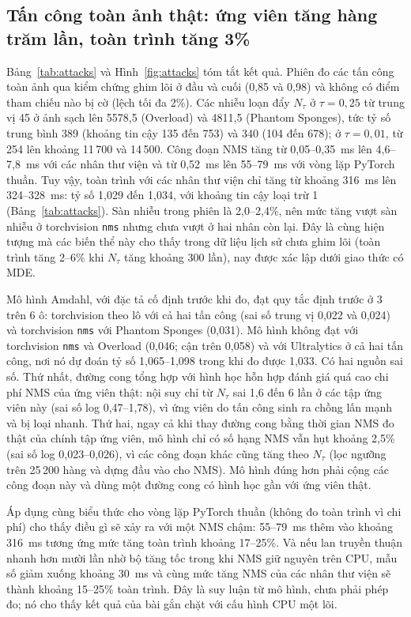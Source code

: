 \documentclass[a4paper,fleqn]{cas-dc}
\newcommand{\Ntau}{N_{\tau}}
\begin{document}
\subsection{Tấn công toàn ảnh thật: ứng viên tăng hàng trăm lần, toàn trình tăng 3\%}
\label{sec:attacks}
Bảng~\ref{tab:attacks} và Hình~\ref{fig:attacks} tóm tắt kết quả. Phiên đo các tấn công toàn ảnh qua kiểm chứng ghim lõi ở đầu và cuối (0,85 và 0,98) và không có điểm tham chiếu nào bị cờ (lệch tối đa 2\%). Các nhiễu loạn đẩy $\Ntau$ ở $\tau=0{,}25$ từ trung vị 45 ở ảnh sạch lên 5578,5 (Overload) và 4811,5 (Phantom Sponges), tức tỷ số trung bình 389 (khoảng tin cậy 135 đến 753) và 340 (104 đến 678); ở $\tau=0{,}01$, từ 254 lên khoảng 11\,700 và 14\,500. Công đoạn NMS tăng từ 0,05--0,35~ms lên 4,6--7,8~ms với các nhân thư viện và từ 0,52~ms lên 55--79~ms với vòng lặp PyTorch thuần. Tuy vậy, toàn trình với các nhân thư viện chỉ tăng từ khoảng 316~ms lên 324--328~ms: tỷ số 1,029 đến 1,034, với khoảng tin cậy loại trừ 1 (Bảng~\ref{tab:attacks}). Sàn nhiễu trong phiên là 2,0--2,4\%, nên mức tăng vượt sàn nhiễu ở torchvision \texttt{nms} nhưng chưa vượt ở hai nhân còn lại. Đây là cùng hiện tượng mà các biến thể này cho thấy trong dữ liệu lịch sử chưa ghim lõi (toàn trình tăng 2--6\% khi $\Ntau$ tăng khoảng 300 lần), nay được xác lập dưới giao thức có MDE.

Mô hình Amdahl, với đặc tả cố định trước khi đo, đạt quy tắc định trước ở 3 trên 6 ô: torchvision theo lô với cả hai tấn công (sai số trung vị 0,022 và 0,024) và torchvision \texttt{nms} với Phantom Sponges (0,031). Mô hình không đạt với torchvision \texttt{nms} và Overload (0,046; cận trên 0,058) và với Ultralytics ở cả hai tấn công, nơi nó dự đoán tỷ số 1,065--1,098 trong khi đo được 1,033. Có hai nguồn sai số. Thứ nhất, đường cong tổng hợp với hình học hỗn hợp đánh giá quá cao chi phí NMS của ứng viên thật: nội suy chỉ từ $\Ntau$ sai 1,6 đến 6 lần ở các tập ứng viên này (sai số log 0,47--1,78), vì ứng viên do tấn công sinh ra chồng lấn mạnh và bị loại nhanh. Thứ hai, ngay cả khi thay đường cong bằng thời gian NMS đo thật của chính tập ứng viên, mô hình chỉ có số hạng NMS vẫn hụt khoảng 2,5\% (sai số log 0,023--0,026), vì các công đoạn khác cũng tăng theo $\Ntau$ (lọc ngưỡng trên 25\,200 hàng và dựng đầu vào cho NMS). Mô hình đúng hơn phải cộng các công đoạn này và dùng một đường cong có hình học gần với ứng viên thật.

Áp dụng cùng biểu thức cho vòng lặp PyTorch thuần (không đo toàn trình vì chi phí) cho thấy điều gì sẽ xảy ra với một NMS chậm: 55--79~ms thêm vào khoảng 316~ms tương ứng mức tăng toàn trình khoảng 17--25\%. Và nếu lan truyền thuận nhanh hơn mười lần nhờ bộ tăng tốc trong khi NMS giữ nguyên trên CPU, mẫu số giảm xuống khoảng 30~ms và cùng mức tăng NMS của các nhân thư viện sẽ thành khoảng 15--25\% toàn trình. Đây là suy luận từ mô hình, chưa phải phép đo; nó cho thấy kết quả của bài gắn chặt với cấu hình CPU một lõi.
\end{document}
